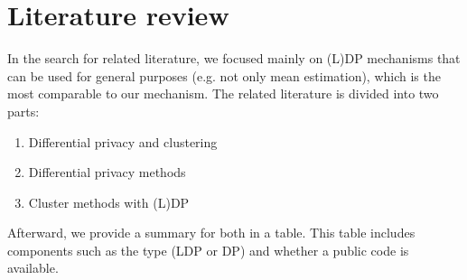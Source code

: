 \section{Literature review} \label{theory:literature-review}
In the search for related literature, we focused mainly on (L)DP mechanisms that can be used for general purposes (e.g. not only mean estimation), which is the most comparable to our mechanism.
The related literature is divided into two parts:
\begin{enumerate}
  \item Differential privacy and clustering
  \item Differential privacy methods
  \item Cluster methods with (L)DP
\end{enumerate}
Afterward, we provide a summary for both in a table.
This table includes components such as the type (LDP or DP) and whether a public code is available.

